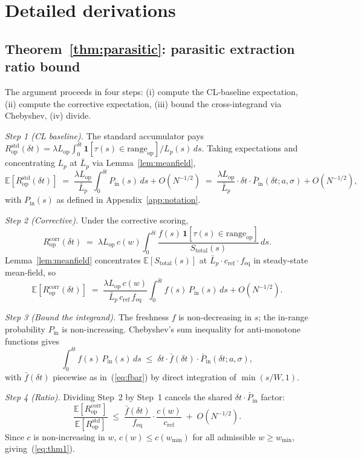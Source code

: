 \documentclass[11pt,a4paper]{article}
\theoremstyle{definition}
\theoremstyle{plain}
\theoremstyle{remark}
\begin{document}
\section{Detailed derivations}\label{app:derivations}

\subsection*{Theorem~\ref{thm:parasitic}: parasitic extraction ratio bound}

The argument proceeds in four steps: (i) compute the CL-baseline expectation, (ii) compute the corrective expectation, (iii) bound the cross-integrand via Chebyshev, (iv) divide.

\noindent\emph{Step 1 (CL baseline).} The standard accumulator pays $R^{\text{std}}_{\text{op}}(\delta t) = \lambda L_{\text{op}} \int_0^{\delta t} \mathbf{1}[\tau(s) \in \text{range}_{\text{op}}] / L_p(s)\,ds$. Taking expectations and concentrating $L_p$ at $\bar L_p$ via Lemma~\ref{lem:meanfield},
\[
\mathbb{E}[R^{\text{std}}_{\text{op}}(\delta t)] \;=\; \frac{\lambda L_{\text{op}}}{\bar L_p} \int_0^{\delta t} P_{\text{in}}(s)\,ds + O(N^{-1/2}) \;=\; \frac{\lambda L_{\text{op}}}{\bar L_p} \cdot \delta t \cdot \bar P_{\text{in}}(\delta t; a, \sigma) + O(N^{-1/2}),
\]
with $P_{\text{in}}(s)$ as defined in Appendix~\ref{app:notation}.

\noindent\emph{Step 2 (Corrective).} Under the corrective scoring,
\[
R^{\text{corr}}_{\text{op}}(\delta t) \;=\; \lambda L_{\text{op}}\, c(w) \int_0^{\delta t} \frac{f(s)\,\mathbf{1}[\tau(s) \in \text{range}_{\text{op}}]}{S_{\text{total}}(s)}\,ds.
\]
Lemma~\ref{lem:meanfield} concentrates $\mathbb{E}[S_{\text{total}}(s)]$ at $\bar L_p \cdot c_{\text{ref}} \cdot f_{\text{eq}}$ in steady-state mean-field, so
\[
\mathbb{E}[R^{\text{corr}}_{\text{op}}(\delta t)] \;=\; \frac{\lambda L_{\text{op}}\, c(w)}{\bar L_p\, c_{\text{ref}}\, f_{\text{eq}}} \int_0^{\delta t} f(s)\,P_{\text{in}}(s)\,ds + O(N^{-1/2}).
\]

\noindent\emph{Step 3 (Bound the integrand).} The freshness $f$ is non-decreasing in $s$; the in-range probability $P_{\text{in}}$ is non-increasing. Chebyshev's sum inequality for anti-monotone functions gives
\[
\int_0^{\delta t} f(s)\,P_{\text{in}}(s)\,ds \;\leq\; \delta t \cdot \bar f(\delta t) \cdot \bar P_{\text{in}}(\delta t; a, \sigma),
\]
with $\bar f(\delta t)$ piecewise as in~(\ref{eq:fbar}) by direct integration of $\min(s/W, 1)$.

\noindent\emph{Step 4 (Ratio).} Dividing Step~2 by Step~1 cancels the shared $\delta t \cdot \bar P_{\text{in}}$ factor:
\[
\frac{\mathbb{E}[R^{\text{corr}}_{\text{op}}]}{\mathbb{E}[R^{\text{std}}_{\text{op}}]} \;\leq\; \frac{\bar f(\delta t)}{f_{\text{eq}}} \cdot \frac{c(w)}{c_{\text{ref}}} \;+\; O(N^{-1/2}).
\]
Since $c$ is non-increasing in $w$, $c(w) \leq c(w_{\min})$ for all admissible $w \geq w_{\min}$, giving~(\ref{eq:thm1}).
\end{document}
